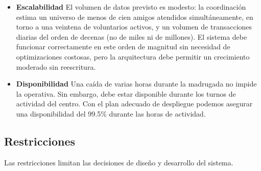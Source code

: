 \begin{itemize}
    \item \textbf{Escalabilidad}
    El volumen de datos previsto es modesto: la coordinación estima un universo
    de menos de cien amigos atendidos simultáneamente, en torno a una veintena
    de voluntarios activos, y un volumen de transacciones diarias del orden de
    decenas (no de miles ni de millones). El sistema debe funcionar
    correctamente en este orden de magnitud sin necesidad de optimizaciones
    costosas, pero la arquitectura debe permitir un crecimiento moderado sin reescritura.

    \item \textbf{Disponibilidad}
    Una caída de varias horas durante la madrugada no impide la operativa. Sin embargo, debe
    estar disponible durante los turnos de actividad del centro. Con el plan adecuado de despliegue
    podemos asegurar una disponibilidad del 99.5\% durante las horas de actividad.
\end{itemize}


\subsection{Restricciones}
Las restricciones limitan las decisiones de diseño y desarrollo del sistema.

